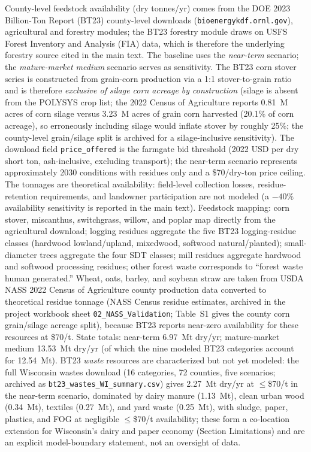 County-level feedstock availability (dry tonnes/yr) comes from the DOE 2023
Billion-Ton Report (BT23) county-level downloads
(\texttt{bioenergykdf.ornl.gov}), agricultural and forestry modules; the BT23
forestry module draws on USFS Forest Inventory and Analysis (FIA) data, which
is therefore the underlying forestry source cited in the main text. The
baseline uses the \emph{near-term} scenario; the \emph{mature-market medium}
scenario serves as sensitivity. The BT23 corn stover series is constructed
from grain-corn production via a 1:1 stover-to-grain ratio and is therefore
\emph{exclusive of silage corn acreage by construction} (silage is absent from
the POLYSYS crop list; the 2022 Census of Agriculture reports 0.81~M acres of
corn silage versus 3.23~M acres of grain corn harvested (20.1\% of corn
acreage), so erroneously including silage would inflate stover by roughly
25\%; the county-level grain/silage split is archived for a silage-inclusive
sensitivity). The download field \texttt{price\_offered} is the
farmgate bid threshold (2022 USD per dry short ton, ash-inclusive, excluding
transport); the near-term scenario represents approximately 2030 conditions
with residues only and a \$70/dry-ton price ceiling. The tonnages are
theoretical availability: field-level collection losses, residue-retention
requirements, and landowner participation are not modeled (a $-40\%$
availability sensitivity is reported in the main text). Feedstock mapping: corn
stover, miscanthus, switchgrass, willow, and poplar map directly from the
agricultural download; logging residues aggregate the five BT23 logging-residue
classes (hardwood lowland/upland, mixedwood, softwood natural/planted);
small-diameter trees aggregate the four SDT classes; mill residues aggregate
hardwood and softwood processing residues; other forest waste corresponds to
``forest waste human generated.'' Wheat, oats, barley, and soybean straw are
taken from USDA NASS 2022 Census of Agriculture county production data
converted to theoretical residue tonnage (NASS Census residue estimates,
archived in the project workbook sheet \texttt{02\_NASS\_Validation};
Table~S1 gives the county corn grain/silage acreage split),
because BT23 reports near-zero availability for these resources at \$70/t.
State totals: near-term 6.97~Mt dry/yr; mature-market medium 13.53~Mt dry/yr
(of which the nine modeled BT23 categories account for 12.54~Mt). BT23
\emph{waste} resources are characterized but not yet modeled: the full
Wisconsin wastes download (16 categories, 72 counties, five scenarios;
archived as \texttt{bt23\_wastes\_WI\_summary.csv}) gives 2.27~Mt dry/yr at
$\le$\$70/t in the near-term scenario, dominated by dairy manure
(1.13~Mt), clean urban wood (0.34~Mt), textiles (0.27~Mt), and yard waste
(0.25~Mt), with sludge, paper, plastics, and FOG at negligible $\le$\$70/t
availability; these form a co-location extension for Wisconsin's dairy and
paper economy (Section Limitations) and are an explicit model-boundary
statement, not an oversight of data.

